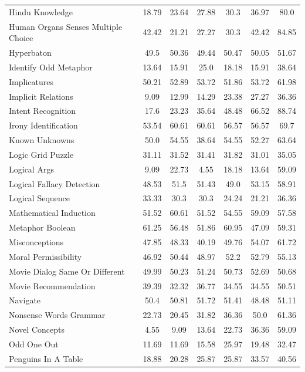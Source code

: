 \documentclass[11pt, a4paper, logo, internal, copyright, nonumbering]{deepmind}
\begin{document}
\begin{table}[ht]
\begin{tabular}{lcccccc}
Hindu Knowledge &  18.79 & 23.64 & 27.88 & 30.3 & 36.97 & 80.0 \\ 
Human Organs Senses Multiple Choice &  42.42 & 21.21 & 27.27 & 30.3 & 42.42 & 84.85 \\ 
Hyperbaton &  49.5 & 50.36 & 49.44 & 50.47 & 50.05 & 51.67 \\ 
Identify Odd Metaphor &  13.64 & 15.91 & 25.0 & 18.18 & 15.91 & 38.64 \\ 
Implicatures &  50.21 & 52.89 & 53.72 & 51.86 & 53.72 & 61.98 \\ 
Implicit Relations &  9.09 & 12.99 & 14.29 & 23.38 & 27.27 & 36.36 \\ 
Intent Recognition &  17.6 & 23.23 & 35.64 & 48.48 & 66.52 & 88.74 \\ 
Irony Identification &  53.54 & 60.61 & 60.61 & 56.57 & 56.57 & 69.7 \\ 
Known Unknowns &  50.0 & 54.55 & 38.64 & 54.55 & 52.27 & 63.64 \\ 
Logic Grid Puzzle &  31.11 & 31.52 & 31.41 & 31.82 & 31.01 & 35.05 \\ 
Logical Args &  9.09 & 22.73 & 4.55 & 18.18 & 13.64 & 59.09 \\ 
Logical Fallacy Detection &  48.53 & 51.5 & 51.43 & 49.0 & 53.15 & 58.91 \\ 
Logical Sequence &  33.33 & 30.3 & 30.3 & 24.24 & 21.21 & 36.36 \\ 
Mathematical Induction &  51.52 & 60.61 & 51.52 & 54.55 & 59.09 & 57.58 \\ 
Metaphor Boolean &  61.25 & 56.48 & 51.86 & 60.95 & 47.09 & 59.31 \\ 
Misconceptions &  47.85 & 48.33 & 40.19 & 49.76 & 54.07 & 61.72 \\ 
Moral Permissibility &  46.92 & 50.44 & 48.97 & 52.2 & 52.79 & 55.13 \\ 
Movie Dialog Same Or Different &  49.99 & 50.23 & 51.24 & 50.73 & 52.69 & 50.68 \\ 
Movie Recommendation &  39.39 & 32.32 & 36.77 & 34.55 & 34.55 & 50.51 \\ 
Navigate &  50.4 & 50.81 & 51.72 & 51.41 & 48.48 & 51.11 \\ 
Nonsense Words Grammar &  22.73 & 20.45 & 31.82 & 36.36 & 50.0 & 61.36 \\ 
Novel Concepts &  4.55 & 9.09 & 13.64 & 22.73 & 36.36 & 59.09 \\ 
Odd One Out &  11.69 & 11.69 & 15.58 & 25.97 & 19.48 & 32.47 \\ 
Penguins In A Table &  18.88 & 20.28 & 25.87 & 25.87 & 33.57 & 40.56 \\ 

\end{tabular}
\end{table}
\end{document}
